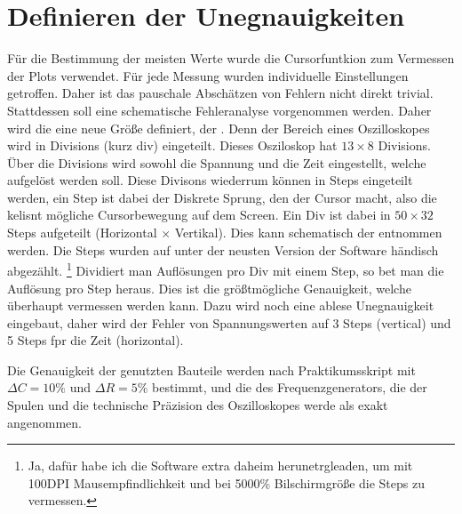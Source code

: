 \newpage

\section{Definieren der Unegnauigkeiten}
\label{sec:A0}
Für die Bestimmung der meisten Werte wurde die Cursorfuntkion zum Vermessen der Plots verwendet. Für jede Messung wurden individuelle Einstellungen getroffen. Daher ist das pauschale Abschätzen von Fehlern nicht direkt trivial. Stattdessen soll eine schematische Fehleranalyse vorgenommen werden. 
Daher wird die eine neue Größe definiert, der . Denn der Bereich eines Oszilloskopes wird in Divisions (kurz div) eingeteilt. Dieses Osziloskop hat $13 \times 8$ Divisions. Über die Divisions wird sowohl die Spannung und die Zeit eingestellt, welche aufgelöst werden soll. Diese Divisons wiederrum können in Steps eingeteilt werden, ein Step ist dabei der Diskrete Sprung, den der Cursor macht, also die kelisnt mögliche Cursorbewegung auf dem Screen. Ein Div ist dabei in $50 \times 32$ Steps aufgeteilt (Horizontal $\times$ Vertikal). Dies kann schematisch der  entnommen werden. Die Steps wurden auf unter der neusten Version der Software händisch abgezählt. \footnote{Ja, dafür habe ich die Software extra daheim herunetrgleaden, um mit 100DPI Mausempfindlichkeit und bei 5000\% Bilschirmgröße die Steps zu vermessen.}
Dividiert man Auflösungen pro Div mit einem Step, so bet man die Auflösung pro Step heraus. Dies ist die größtmögliche Genauigkeit, welche überhaupt vermessen werden kann. Dazu wird noch eine ablese Unegnauigkeit eingebaut, daher wird der Fehler von Spannungswerten auf 3 Steps (vertical) und 5 Steps fpr die Zeit (horizontal).


Die Genauigkeit der genutzten Bauteile werden nach Praktikumsskript mit $\Delta C = 10\%$ und $\Delta R = 5\%$ bestimmt, und die des Frequenzgenerators, die der Spulen und die technische Präzision des Oszilloskopes werde als exakt angenommen. 

